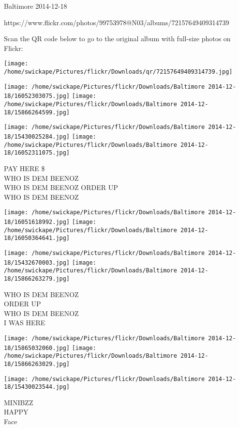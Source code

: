 \documentclass[10pt,letterpaper]{article}
\begin{document}
Baltimore 2014-12-18

https://www.flickr.com/photos/99753978@N03/albums/72157649409314739

Scan the QR code below to go to the original album with full-size photos on Flickr:

\texttt{[image: /home/swickape/Pictures/flickr/Downloads/qr/72157649409314739.jpg]}
\pagebreak

\texttt{[image: /home/swickape/Pictures/flickr/Downloads/Baltimore 2014-12-18/16052303075.jpg]}
\texttt{[image: /home/swickape/Pictures/flickr/Downloads/Baltimore 2014-12-18/15866264599.jpg]}

\texttt{[image: /home/swickape/Pictures/flickr/Downloads/Baltimore 2014-12-18/15430025284.jpg]}
\texttt{[image: /home/swickape/Pictures/flickr/Downloads/Baltimore 2014-12-18/16052311075.jpg]}

PAY HERE \$\\
WHO IS DEM BEENOZ\\
WHO IS DEM BEENOZ ORDER UP\\
WHO IS DEM BEENOZ
\pagebreak

\texttt{[image: /home/swickape/Pictures/flickr/Downloads/Baltimore 2014-12-18/16051618992.jpg]}
\texttt{[image: /home/swickape/Pictures/flickr/Downloads/Baltimore 2014-12-18/16050364641.jpg]}

\texttt{[image: /home/swickape/Pictures/flickr/Downloads/Baltimore 2014-12-18/15432670003.jpg]}
\texttt{[image: /home/swickape/Pictures/flickr/Downloads/Baltimore 2014-12-18/15866263279.jpg]}

WHO IS DEM BEENOZ\\
ORDER UP\\
WHO IS DEM BEENOZ\\
I WAS HERE
\pagebreak

\texttt{[image: /home/swickape/Pictures/flickr/Downloads/Baltimore 2014-12-18/15865032060.jpg]}
\texttt{[image: /home/swickape/Pictures/flickr/Downloads/Baltimore 2014-12-18/15866263029.jpg]}

\vspace{0.25in}
\texttt{[image: /home/swickape/Pictures/flickr/Downloads/Baltimore 2014-12-18/15430023544.jpg]}

MINIBZZ\\
HAPPY\\
Face
\pagebreak
\end{document}
